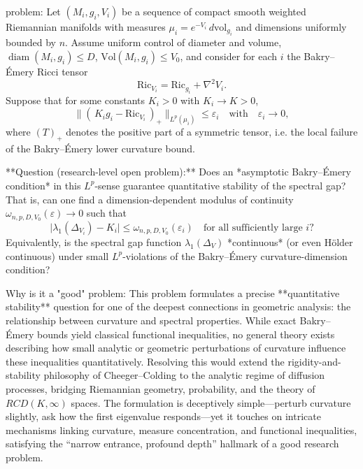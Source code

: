 problem:  
Let \((M_i,g_i,V_i)\) be a sequence of compact smooth weighted Riemannian manifolds with measures  
\(\mu_i = e^{-V_i}\, d\mathrm{vol}_{g_i}\) and dimensions uniformly bounded by \(n\).  
Assume uniform control of diameter and volume,  
\(\operatorname{diam}(M_i,g_i)\le D\), \(\mathrm{Vol}(M_i,g_i)\le V_0\), and consider for each \(i\) the Bakry–Émery Ricci tensor  
\[
\mathrm{Ric}_{V_i} = \mathrm{Ric}_{g_i} + \nabla^2 V_i.
\]  
Suppose that for some constants \(K_i>0\) with \(K_i\to K>0\),
\[
\|(\,K_i g_i - \mathrm{Ric}_{V_i}\,)_+\|_{L^p(\mu_i)} \le \varepsilon_i \quad\text{with}\quad \varepsilon_i\to 0,
\]
where \((T)_+\) denotes the positive part of a symmetric tensor, i.e. the local failure of the Bakry–Émery lower curvature bound.  

**Question (research-level open problem):**  
Does an *asymptotic Bakry–Émery condition* in this \(L^p\)-sense guarantee quantitative stability of the spectral gap?  
That is, can one find a dimension-dependent modulus of continuity \(\omega_{n,p,D,V_0}(\varepsilon)\to 0\) such that  
\[
\big|\lambda_1(\Delta_{V_i}) - K_i\big| \le \omega_{n,p,D,V_0}(\varepsilon_i)
\quad\text{for all sufficiently large }i?
\]  
Equivalently, is the spectral gap function \(\lambda_1(\Delta_V)\) *continuous* (or even Hölder continuous) under small \(L^p\)-violations of the Bakry–Émery curvature-dimension condition?  

Why is it a "good" problem:  
This problem formulates a precise **quantitative stability** question for one of the deepest connections in geometric analysis: the relationship between curvature and spectral properties. While exact Bakry–Émery bounds yield classical functional inequalities, no general theory exists describing how small analytic or geometric perturbations of curvature influence these inequalities quantitatively. Resolving this would extend the rigidity-and-stability philosophy of Cheeger–Colding to the analytic regime of diffusion processes, bridging Riemannian geometry, probability, and the theory of \(RCD(K,\infty)\) spaces. The formulation is deceptively simple—perturb curvature slightly, ask how the first eigenvalue responds—yet it touches on intricate mechanisms linking curvature, measure concentration, and functional inequalities, satisfying the “narrow entrance, profound depth” hallmark of a good research problem.